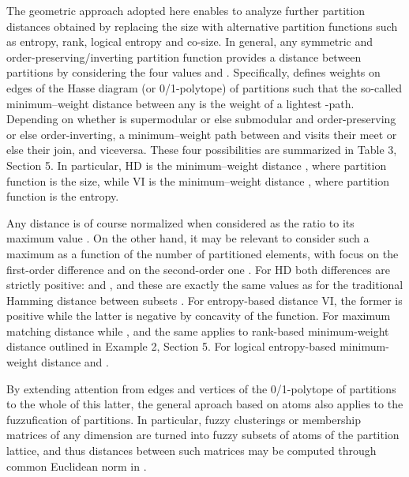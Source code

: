 \documentclass[a4paper,10pt]{article}
\begin{document}
The geometric approach adopted here enables to analyze further partition distances obtained by replacing the size with alternative partition functions such as entropy, rank,
logical entropy and co-size. In general, any symmetric and order-preserving/inverting partition function  provides a distance between partitions  by considering the four
values  and . Specifically,  defines weights on edges of the Hasse diagram (or 0/1-polytope) of partitions such that the so-called minimum--weight
distance between any  is the weight of a lightest -path. Depending on whether  is supermodular or else submodular and order-preserving or else order-inverting, a
minimum--weight path between  and  visits their meet or else their join, and viceversa. These four possibilities are summarized in Table 3, Section 5. In particular, HD is the
minimum--weight distance , where partition function  is the size, while VI is the minimum--weight distance , where partition function  is the entropy.

Any distance is of course normalized when considered as the ratio to its maximum value . On the other hand, it may be relevant to consider such a maximum as a function
 of the number  of partitioned elements, with focus on the first-order difference  and on the second-order one
. For HD both differences are strictly positive:  and , and
these are exactly the same values  as for the traditional Hamming distance  between subsets . For entropy-based
distance VI, the former  is positive while the latter  is negative by concavity of
the  function. For maximum matching distance  while , and the same applies to rank-based minimum-weight distance
 outlined in Example 2, Section 5. For logical entropy-based minimum-weight distance  and
.

By extending attention from edges and vertices of the 0/1-polytope of partitions to the whole of this latter, the general aproach based on atoms also applies to the fuzzufication
of partitions. In particular, fuzzy clusterings or membership matrices of any dimension are turned into fuzzy subsets of atoms of the partition lattice, and thus distances between
such matrices may be computed through common Euclidean norm in . 




\end{document}
